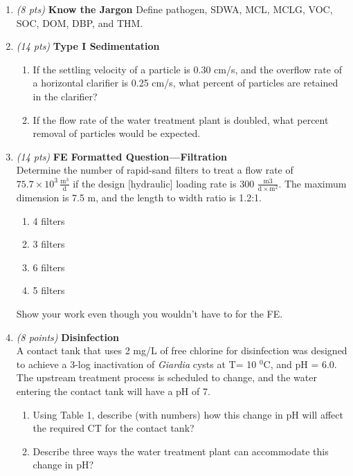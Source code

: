 \documentclass[12pt,letterpaper]{article}
\begin{document}
\begin{enumerate}
\item \emph{(8 pts)} \textbf{Know the Jargon}
 Define pathogen, SDWA, MCL, MCLG, VOC, SOC, DOM, DBP, and THM.

\item \emph{(14 pts)} \textbf{Type I Sedimentation}
\begin{enumerate}
\item If the settling velocity of a particle is 0.30 cm/s, and the overflow rate of a horizontal clarifier is 0.25 cm/s, what percent of particles are retained in the clarifier? 
\item If the flow rate of the water treatment plant is doubled, what percent removal of particles would be expected.
\end{enumerate}

\item \emph{(14 pts)} \textbf{FE Formatted Question---Filtration}\\Determine the number of rapid-sand filters to treat a flow rate of $\mathrm{75.7\times 10^3\, \frac{m^3}{d}}$ if the design [hydraulic] loading rate is 300 $\mathrm{\frac{m3}{d\times m^2}}$.  The maximum dimension is 7.5 m, and the length to width ratio is 1.2:1.

\begin{enumerate}
\item 4 filters
\item 3 filters
\item 6 filters
\item 5 filters
\end{enumerate}
Show your work even though you wouldn't have to for the FE.

\item \emph{(8 points)} \textbf{Disinfection}\\
A contact tank that uses 2 mg/L of free chlorine for disinfection was designed to achieve a 3-log inactivation of \emph{Giardia} cysts at T= 10 $^0$C, and pH = 6.0.  The upstream treatment process is scheduled to change, and the water entering the contact tank will have a pH of 7.  

\begin{enumerate}
\item Using Table 1, describe (with numbers) how this change in pH will affect the required CT for the contact tank? 
\item Describe three ways the water treatment plant can accommodate this change in pH?
\end{enumerate}


\end{enumerate}
\end{document}
